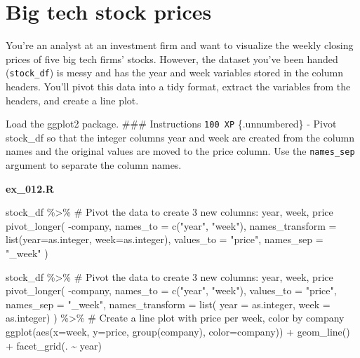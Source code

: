 \documentclass[
  letterpaper,
  DIV=11,
  numbers=noendperiod]{scrreprt}
\newenvironment{Shaded}{\begin{snugshade}}{\end{snugshade}}
\newcommand{\AttributeTok}[1]{\textcolor[rgb]{0.40,0.45,0.13}{#1}}
\newcommand{\CommentTok}[1]{\textcolor[rgb]{0.37,0.37,0.37}{#1}}
\newcommand{\FunctionTok}[1]{\textcolor[rgb]{0.28,0.35,0.67}{#1}}
\newcommand{\NormalTok}[1]{\textcolor[rgb]{0.00,0.23,0.31}{#1}}
\newcommand{\SpecialCharTok}[1]{\textcolor[rgb]{0.37,0.37,0.37}{#1}}
\newcommand{\StringTok}[1]{\textcolor[rgb]{0.13,0.47,0.30}{#1}}
\begin{document}
\hypertarget{big-tech-stock-prices}{%
\section{Big tech stock prices}\label{big-tech-stock-prices}}

You're an analyst at an investment firm and want to visualize the weekly
closing prices of five big tech firms' stocks. However, the dataset
you've been handed (\texttt{stock\_df}) is messy and has the year and
week variables stored in the column headers. You'll pivot this data into
a tidy format, extract the variables from the headers, and create a line
plot.

Load the ggplot2 package. \#\#\# Instructions \texttt{100\ XP}
\{.unnumbered\} - Pivot stock\_df so that the integer columns year and
week are created from the column names and the original values are moved
to the price column. Use the \texttt{names\_sep} argument to separate
the column names.

\textbf{ex\_012.R}

\begin{Shaded}
\begin{Highlighting}[]
\NormalTok{stock\_df }\SpecialCharTok{\%\textgreater{}\%} 
  \CommentTok{\# Pivot the data to create 3 new columns: year, week, price}
\FunctionTok{pivot\_longer}\NormalTok{(}
  \SpecialCharTok{{-}}\NormalTok{company,}
  \AttributeTok{names\_to =} \FunctionTok{c}\NormalTok{(}\StringTok{"year"}\NormalTok{, }\StringTok{"week"}\NormalTok{),}
  \AttributeTok{names\_transform =} \FunctionTok{list}\NormalTok{(}\AttributeTok{year=}\NormalTok{as.integer, }\AttributeTok{week=}\NormalTok{as.integer),}
  \AttributeTok{values\_to =} \StringTok{"price"}\NormalTok{, }
  \AttributeTok{names\_sep =} \StringTok{"\_week"}
\NormalTok{)}

\NormalTok{stock\_df }\SpecialCharTok{\%\textgreater{}\%} 
  \CommentTok{\# Pivot the data to create 3 new columns: year, week, price}
  \FunctionTok{pivot\_longer}\NormalTok{(}
    \SpecialCharTok{{-}}\NormalTok{company,}
    \AttributeTok{names\_to =} \FunctionTok{c}\NormalTok{(}\StringTok{"year"}\NormalTok{, }\StringTok{"week"}\NormalTok{),}
    \AttributeTok{values\_to =} \StringTok{"price"}\NormalTok{,}
    \AttributeTok{names\_sep =} \StringTok{"\_week"}\NormalTok{,}
    \AttributeTok{names\_transform =} \FunctionTok{list}\NormalTok{(}
      \AttributeTok{year =}\NormalTok{ as.integer,}
      \AttributeTok{week =}\NormalTok{ as.integer)}
\NormalTok{  ) }\SpecialCharTok{\%\textgreater{}\%}
  \CommentTok{\# Create a line plot with price per week, color by company}
  \FunctionTok{ggplot}\NormalTok{(}\FunctionTok{aes}\NormalTok{(}\AttributeTok{x=}\NormalTok{week, }\AttributeTok{y=}\NormalTok{price, }\FunctionTok{group}\NormalTok{(company), }\AttributeTok{color=}\NormalTok{company)) }\SpecialCharTok{+}
  \FunctionTok{geom\_line}\NormalTok{() }\SpecialCharTok{+}
  \FunctionTok{facet\_grid}\NormalTok{(. }\SpecialCharTok{\textasciitilde{}}\NormalTok{ year)}
\end{Highlighting}
\end{Shaded}
\end{document}
